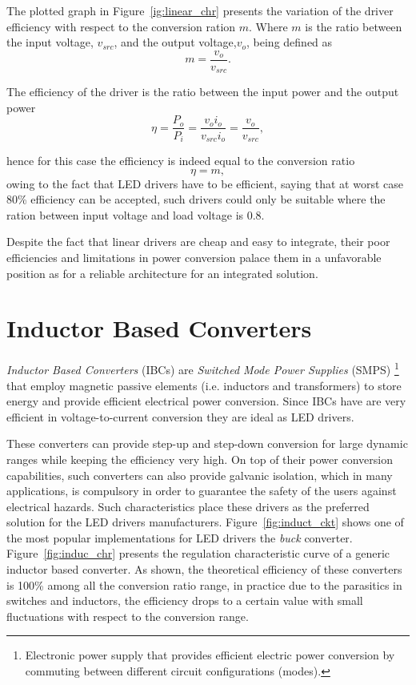 The plotted graph in Figure~\ref{ig:linear_chr} presents the variation of the driver efficiency with respect to the conversion ration $m$. Where $m$  is the ratio between the input voltage, $v_{src}$,  and the output voltage,$v_o$, being defined as
   \begin{equation}
        m = \frac{v_o}{v_{src}}.
   \end{equation}

The efficiency of the driver is the ratio between the input power and the output power
   \begin{equation}
        \eta = \frac{P_o}{P_i} = \frac{v_o i_o}{v_{src} i_o} = \frac{v_o}{v_{src}},
   \end{equation}

hence for this case the efficiency is indeed equal to the conversion ratio
   \begin{equation}
        \eta = m,
   \end{equation}
owing to the fact that LED drivers have to be efficient, saying that at worst case 80\% efficiency can be accepted, such drivers could only be suitable where the ration between input voltage and load voltage is 0.8.

Despite the fact that linear drivers are cheap and easy to integrate, their poor efficiencies and limitations in power conversion palace them in a unfavorable position as for a reliable architecture for an integrated solution.

\section{Inductor Based Converters}

\emph{Inductor Based Converters} (IBCs) are \emph{Switched Mode Power Supplies} (SMPS) \footnote{Electronic power supply that provides efficient electric power conversion by commuting between different circuit configurations (modes).}  that employ magnetic passive elements (i.e. inductors and transformers) to store energy and provide efficient electrical power conversion. Since IBCs have are very efficient in voltage-to-current conversion they are ideal as LED drivers.

These converters can provide step-up and step-down conversion for large dynamic ranges while keeping the efficiency very high. On top of their power conversion capabilities, such converters can also provide galvanic isolation, which in many applications, is compulsory in order to guarantee the safety of the users against electrical hazards. Such characteristics place these drivers as the preferred solution for the LED drivers manufacturers. Figure~\ref{fig:induct_ckt} shows one of the most popular implementations for LED drivers the \emph{buck} converter.  Figure~\ref{fig:induc_chr} presents the regulation characteristic curve of a generic  inductor based converter. As shown, the theoretical efficiency of these converters is 100\% among all the conversion ratio range, in practice due to the parasitics in switches and inductors, the efficiency drops to a certain value with small fluctuations with respect to the conversion range.

